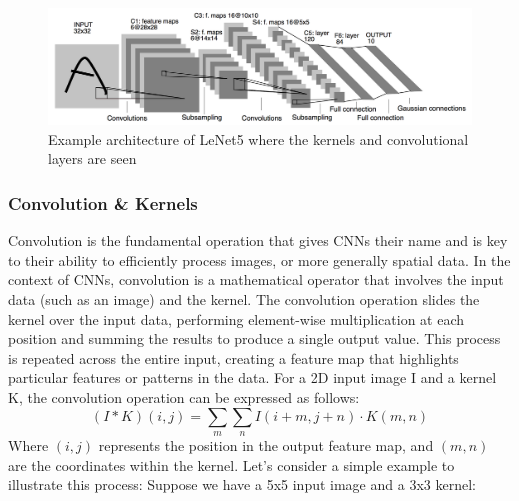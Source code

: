 \begin{figure}[H]
    \centering
    \includegraphics[width=\textwidth]{images/LeNet5Arch.png}
    \caption{Example architecture of LeNet5 \cite{LeNet5} where the kernels and convolutional layers are seen}
    \label{LeNet}
\end{figure}

\subsubsection{Convolution \& Kernels}
Convolution \cite{Goodfellow-et-al-2016} is the fundamental operation that gives CNNs their name and is key to their ability to efficiently process images, or more generally spatial data. In the context of CNNs, convolution is a mathematical operator that involves the input data (such as an image) and the kernel.
The convolution operation slides the kernel over the input data, performing element-wise multiplication at each position and summing the results to produce a single output value. This process is repeated across the entire input, creating a feature map that highlights particular features or patterns in the data.
For a 2D input image I and a kernel K, the convolution operation can be expressed as follows:
\[
(I * K)(i, j) = \sum_{m} \sum_{n} I(i+m, j+n) \cdot K(m, n)
\]
Where $(i,j)$ represents the position in the output feature map, and $(m,n)$ are the coordinates within the kernel.
Let's consider a simple example to illustrate this process:
Suppose we have a 5x5 input image and a 3x3 kernel:

